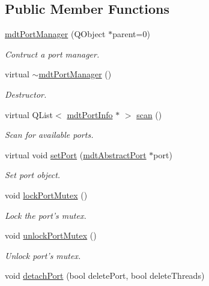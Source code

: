 \subsection*{Public Member Functions}
\begin{DoxyCompactItemize}
\item 
\hyperlink{classmdt_port_manager_a5ec36523089b7528d973e29cdbc64d01}{mdtPortManager} (QObject $\ast$parent=0)
\begin{DoxyCompactList}\small\item\em Contruct a port manager. \end{DoxyCompactList}\item 
virtual \hyperlink{classmdt_port_manager_adf797f8fd7a3ffdc000890a224e4c1b6}{$\sim$mdtPortManager} ()
\begin{DoxyCompactList}\small\item\em Destructor. \end{DoxyCompactList}\item 
virtual QList$<$ \hyperlink{classmdt_port_info}{mdtPortInfo} $\ast$ $>$ \hyperlink{classmdt_port_manager_ad56afb411ab5468005fca04767557ece}{scan} ()
\begin{DoxyCompactList}\small\item\em Scan for available ports. \end{DoxyCompactList}\item 
virtual void \hyperlink{classmdt_port_manager_afcd156b2d0c9d340999935efb6cd8cb6}{setPort} (\hyperlink{classmdt_abstract_port}{mdtAbstractPort} $\ast$port)
\begin{DoxyCompactList}\small\item\em Set port object. \end{DoxyCompactList}\item 
void \hyperlink{classmdt_port_manager_a3107b7121dfe5b9686d9b3b3a48a0af0}{lockPortMutex} ()
\begin{DoxyCompactList}\small\item\em Lock the port's mutex. \end{DoxyCompactList}\item 
void \hyperlink{classmdt_port_manager_a882e6bf95dac9cd4ab8cc93ecc524874}{unlockPortMutex} ()
\begin{DoxyCompactList}\small\item\em Unlock port's mutex. \end{DoxyCompactList}\item 
void \hyperlink{classmdt_port_manager_a39cb4af4aedc0b6b7c4d4f53002c3fd1}{detachPort} (bool deletePort, bool deleteThreads)

\end{DoxyCompactItemize}
